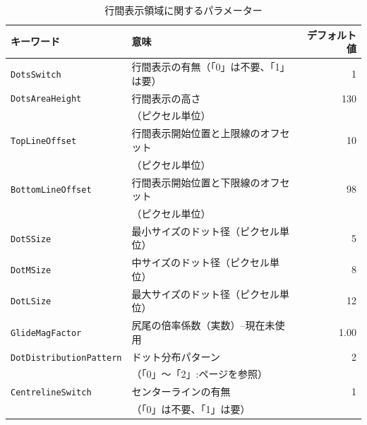 \begin{table}[h]\label{DotsAreaParameters}
	\centering
	\caption{行間表示領域に関するパラメーター}
	\smallskip
	\begin{tabular}{llr}
	\hline
	キーワード & 意味 & デフォルト値\\
	\hline
	\hline
	\texttt{DotsSwitch} & 行間表示の有無（「0」は不要、「1」は要）
	 & 1\\
	\hline
	\texttt{DotsAreaHeight} & 行間表示の高さ & 130\\
	& （ピクセル単位） & \\
	\hline
	\texttt{TopLineOffset} & 行間表示開始位置と上限線のオフセット & 10\\
	& （ピクセル単位）& \\
	\hline
	\texttt{BottomLineOffset} & 行間表示開始位置と下限線のオフセット & 98\\
	& （ピクセル単位）& \\
	\hline
	\texttt{DotSSize} & 最小サイズのドット径（ピクセル単位）
	 & 5\\
	\hline
	\texttt{DotMSize} & 中サイズのドット径（ピクセル単位）
	 & 8\\
	\hline
	\texttt{DotLSize} & 最大サイズのドット径（ピクセル単位）
	 & 12\\
	\hline
	\texttt{GlideMagFactor} & 尻尾の倍率係数（実数）--現在未使用
	 & 1.00\\
	\hline
	\texttt{DotDistributionPattern} & ドット分布パターン  & 2\\
	\hline
	& （「0」〜「2」:\pageref{dotdistribution}ページを参照）  & \\
	\hline
	\texttt{CentrelineSwitch} & センターラインの有無 & 1\\
	& （「0」は不要、「1」は要） & \\
	\hline
	\end{tabular}
\end{table}

